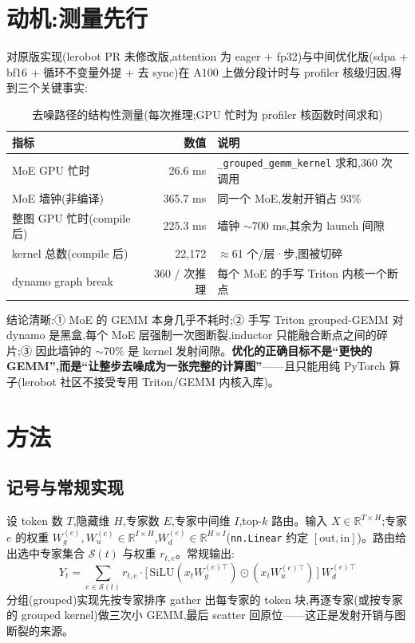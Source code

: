 \documentclass[11pt]{ctexart}
\begin{document}
\section{动机:测量先行}
对原版实现(lerobot PR 未修改版,attention 为 eager + fp32)与中间优化版(sdpa + bf16 + 循环不变量外提 + 去 sync)在 A100 上做分段计时与 profiler 核级归因,得到三个关键事实:

\begin{table}[htbp]
\centering\small
\caption{去噪路径的结构性测量(每次推理;GPU 忙时为 profiler 核函数时间求和)}
\begin{tabular}{@{}lrp{6.4cm}@{}}
\toprule
指标 & \multicolumn{1}{r}{数值} & 说明 \\
\midrule
MoE GPU 忙时 & 26.6 ms & \texttt{\_grouped\_gemm\_kernel} 求和,360 次调用 \\
MoE 墙钟(非编译) & 365.7 ms & 同一个 MoE,发射开销占 93\% \\
整图 GPU 忙时(compile 后) & 225.3 ms & 墙钟 $\sim$700 ms,其余为 launch 间隙 \\
kernel 总数(compile 后) & 22{,}172 & $\approx$61 个/层·步,图被切碎 \\
dynamo graph break & 360 / 次推理 & 每个 MoE 的手写 Triton 内核一个断点 \\
\bottomrule
\end{tabular}
\end{table}

结论清晰:① MoE 的 GEMM 本身几乎不耗时;② 手写 Triton grouped-GEMM 对 dynamo 是黑盒,每个 MoE 层强制一次图断裂,inductor 只能融合断点之间的碎片;③ 因此墙钟的 $\sim$70\% 是 kernel 发射间隙。\textbf{优化的正确目标不是``更快的 GEMM'',而是``让整步去噪成为一张完整的计算图''}——且只能用纯 PyTorch 算子(lerobot 社区不接受专用 Triton/GEMM 内核入库)。

\section{方法}

\subsection{记号与常规实现}
设 token 数 $T$,隐藏维 $H$,专家数 $E$,专家中间维 $I$,top-$k$ 路由。输入 $X \in \mathbb{R}^{T\times H}$;专家 $e$ 的权重 $W_g^{(e)}, W_u^{(e)} \in \mathbb{R}^{I\times H}$,$W_d^{(e)} \in \mathbb{R}^{H\times I}$(\texttt{nn.Linear} 约定 $[\text{out},\text{in}]$)。路由给出选中专家集合 $\mathcal{S}(t)$ 与权重 $r_{t,e}$。常规输出:
\begin{equation}
Y_t = \sum_{e\in\mathcal{S}(t)} r_{t,e}\cdot \big[\, \mathrm{SiLU}(x_t W_g^{(e)\top}) \odot (x_t W_u^{(e)\top}) \,\big]\, W_d^{(e)\top}
\end{equation}
分组(grouped)实现先按专家排序 gather 出每专家的 token 块,再逐专家(或按专家的 grouped kernel)做三次小 GEMM,最后 scatter 回原位——这正是发射开销与图断裂的来源。
\end{document}

